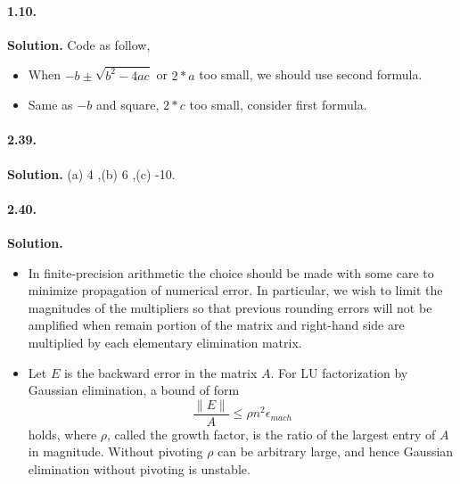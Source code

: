 \documentclass[a4paper]{book}
\newenvironment{solution}%
{\noindent\textbf{Solution.}}%
{\qedhere}
\numberwithin{equation}{chapter}
\theoremstyle{definition}
\begin{document}
\paragraph*{1.10. }
\begin{solution}
    Code as follow,
    \begin{itemize}
        \item When $-b \pm \sqrt{b^2 - 4ac}$ or $2 * a$ too small,
              we should use second formula.

        \item Same as $-b$ and square, $2 * c$ too small, consider
              first formula.
    \end{itemize}

    
\end{solution}

\paragraph*{2.39. }
\begin{solution}
    (a) 4 ,(b) 6 ,(c) -10.
\end{solution}

\paragraph*{2.40. }
\begin{solution}
    \begin{itemize}
        \item In finite-precision arithmetic the choice should be
              made with some care to minimize propagation of numerical
              error. In particular, we wish to limit the magnitudes of
              the multipliers so that previous rounding errors will not
              be amplified when remain portion of the matrix and right-hand
              side are multiplied by each elementary elimination matrix.

        \item     Let $\mathit{E}$ is the backward error in the matrix $\mathit{A}$.
              For LU factorization by Gaussian elimination, a bound of form
              \[ \frac{\| \mathit{E}\|}{\mathit{A}} \leq \rho n^2 \epsilon_{mach}\]
              holds, where $\rho$, called the growth factor, is  the ratio of
              the largest entry of $\mathit{A}$ in magnitude. Without pivoting
              $\rho$ can be arbitrary large, and hence Gaussian elimination
              without pivoting is unstable.
    \end{itemize}

\end{solution}
\end{document}
